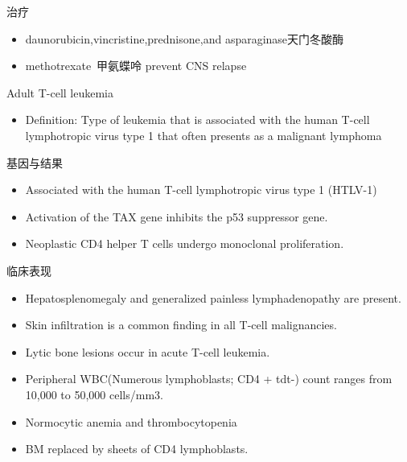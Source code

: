 \documentclass[
  ignorenonframetext,
]{beamer}
\providecommand{\tightlist}{%
  \setlength{\itemsep}{0pt}\setlength{\parskip}{0pt}}
\begin{document}
\begin{frame}
\begin{block}{治疗}
\protect\hypertarget{ux6cbbux7597-7}{}
\begin{itemize}
\item
  daunorubicin,vincristine,prednisone,and asparaginase天门冬酸酶
\item
  methotrexate~甲氨蝶呤 prevent CNS relapse
\end{itemize}
\end{block}
\end{frame}

\begin{frame}
\begin{block}{Adult T-cell leukemia}
\protect\hypertarget{adult-t-cell-leukemia}{}
\begin{itemize}
\tightlist
\item
  Definition: Type of leukemia that is associated with the human T-cell
  lymphotropic virus type 1 that often presents as a malignant lymphoma
\end{itemize}
\end{block}
\end{frame}

\begin{frame}
\begin{block}{基因与结果}
\protect\hypertarget{ux57faux56e0ux4e0eux7ed3ux679c}{}
\begin{itemize}
\item
  Associated with the human T-cell lymphotropic virus type 1 (HTLV-1)
\item
  Activation of the TAX gene inhibits the p53 suppressor gene.
\item
  Neoplastic CD4 helper T cells undergo monoclonal proliferation.
\end{itemize}
\end{block}
\end{frame}

\begin{frame}
\begin{block}{临床表现}
\protect\hypertarget{ux4e34ux5e8aux8868ux73b0-7}{}
\begin{itemize}
\item
  Hepatosplenomegaly and generalized painless lymphadenopathy are
  present.
\item
  Skin infiltration is a common finding in all T-cell malignancies.
\item
  Lytic bone lesions occur in acute T-cell leukemia.
\item
  Peripheral WBC(Numerous lymphoblasts; CD4 + tdt-) count ranges from
  10,000 to 50,000 cells/mm3.
\item
  Normocytic anemia and thrombocytopenia
\item
  BM replaced by sheets of CD4 lymphoblasts.
\end{itemize}
\end{block}
\end{frame}
\end{document}
